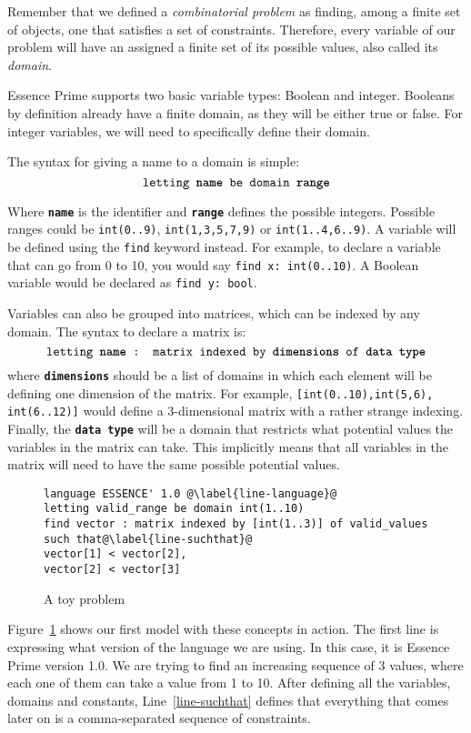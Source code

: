 Remember that we defined a \emph{combinatorial problem} as finding, among a
finite set of objects, one that satisfies a set of constraints.  Therefore,
every variable of our problem will have an assigned a finite set
of its possible values, also called its \emph{domain}. 

Essence Prime supports two basic variable types: Boolean and integer. Booleans
by definition already have a finite domain, as they will be either true or false.
For integer variables, we will need to specifically define their domain.

The syntax for giving a name to a domain is simple:
$$\texttt{letting \textbf{name} be domain \textbf{range}}$$

Where \texttt{\textbf{name}} is the identifier and \texttt{\textbf{range}}
defines the possible integers. Possible ranges could be \texttt{int(0..9)},
\texttt{int(1,3,5,7,9)} or \texttt{int(1..4,6..9)}.  A variable will be defined
using the \texttt{find} keyword instead. For example, to declare a variable
that can go from 0 to 10, you would say \texttt{find x: int(0..10)}. A Boolean
variable would be declared as \texttt{find y: bool}.

Variables can also be grouped into matrices, which can be indexed by any domain.
The syntax to declare a matrix is:
$$\texttt{letting \textbf{name} : matrix indexed by \textbf{dimensions} of \textbf{data type}}$$
where \texttt{\textbf{dimensions}} should be a list of domains in which each
element will be defining one dimension of the matrix. For example,
\texttt{[int(0..10),int(5,6), int(6..12)]} would define a 3-dimensional matrix
with a rather strange indexing. Finally, the \texttt{\textbf{data type}} will
be a domain that restricts what potential values the variables in the matrix
can take.  This implicitly means that all variables in the matrix will need to
have the same possible potential values.

\begin{figure}
\begin{lstlisting}
language ESSENCE' 1.0 @\label{line-language}@
letting valid_range be domain int(1..10)
find vector : matrix indexed by [int(1..3)] of valid_values
such that@\label{line-suchthat}@
vector[1] < vector[2],
vector[2] < vector[3]
\end{lstlisting}
    \caption{A toy problem}
\label{fig-toyexample}
\end{figure}

Figure~\ref{fig-toyexample} shows our first model with these concepts in
action.  The first line is expressing what version of the language we are
using.  In this case, it is Essence Prime version 1.0. We are trying to find an
increasing sequence of 3 values, where each one of them can take a value from 1
to 10. After defining all the variables, domains and constants,
Line~\ref{line-suchthat} defines that everything that comes later on is a
comma-separated sequence of constraints. 


